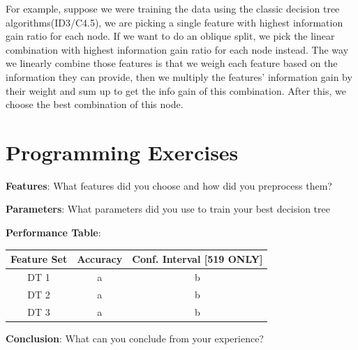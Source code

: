 \documentclass{article}
\begin{document}
        For example, suppose we were training the data using the classic decision tree algorithms(ID3/C4.5), we are picking a single feature with highest information gain ratio for each node. If we want to do an oblique split, we pick the linear combination with highest information gain ratio for each node instead. The way we linearly combine those features is that we weigh each feature based on the information they can provide, then we multiply the features' information gain by their weight and sum up to get the info gain of this combination. After this, we choose the best combination of this node.
        
        
        \section{Programming Exercises}
        \textbf{Features}: What features did you choose and how did you preprocess them?
        
        \noindent\textbf{Parameters}: What parameters did you use to train your best decision tree
        
        \noindent\textbf{Performance Table}: 
        \begin{center}
            \begin{tabular}{|c|c|c|}
                \hline
                Feature Set & Accuracy & Conf. Interval [519 ONLY]\\
                \hline
                DT 1 & a & b  \\
                DT 2 & a & b  \\
                DT 3 & a & b  \\
                \hline
        \end{tabular}
                \end{center}
        
        
        
        \textbf{Conclusion}: What can you conclude from your experience?
        
\end{document}
